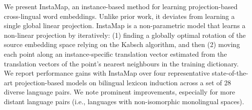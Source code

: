 We present InstaMap, an instance-based method for learning projection-based cross-lingual word embeddings. Unlike prior work, it deviates from learning a single global linear projection. InstaMap is a non-parametric model that learns a non-linear projection by iteratively: (1) finding a globally optimal rotation of the source embedding space relying on the Kabsch algorithm, and then (2) moving each point along an instance-specific translation vector estimated from the translation vectors of the point's nearest neighbours in the training dictionary. We report performance gains with InstaMap over four representative state-of-the-art projection-based models on bilingual lexicon induction across a set of 28 diverse language pairs. We note prominent improvements, especially for more distant language pairs (i.e., languages with non-isomorphic monolingual spaces).
